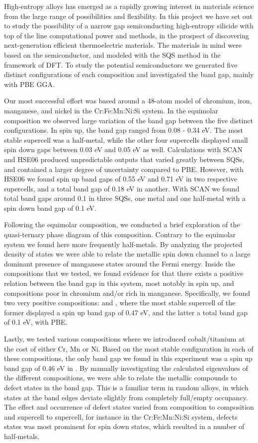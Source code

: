 \documentclass[UKenglish]{ifimaster}  %
\begin{document}
High-entropy alloys has emerged as a rapidly growing interest in materials science from the large range of possibilities and flexibility. In this project we have set out to study the possibility of a narrow gap semiconducting high-entropy silicide with top of the line computational power and methods, in the prospect of discovering next-generation efficient thermoelectric materials. The materials in mind were based on the  semiconductor, and modeled with the SQS method in the framework of DFT. To study the potential semiconductors we generated five distinct configurations of each composition and investigated the band gap, mainly with PBE GGA.  

Our most successful effort was based around a 48-atom model of chromium, iron, manganese, and nickel in the Cr:Fe:Mn:Ni:Si system. In the equimolar composition  we observed large variation of the band gap between the five distinct configurations. In spin up, the band gap ranged from 0.08 - 0.34 eV. The most stable supercell was a half-metal, while the other four supercells displayed small spin down gaps between 0.03 eV and 0.05 eV as well. Calculations with SCAN and HSE06 produced unpredictable outputs that varied greatly between SQSs, and contained a larger degree of uncertainty compared to PBE. However, with HSE06 we found spin up band gaps of 0.55 eV and 0.71 eV in two respective supercells, and a total band gap of 0.18 eV in another. With SCAN we found total band gaps around 0.1 in three SQSs, one metal and one half-metal with a spin down band gap of 0.1 eV.   

Following the equimolar composition, we conducted a brief exploration of the quasi-ternary phase diagram of this composition. Contrary to the equimolar system we found here more frequently half-metals. By analyzing the projected density of states we were able to relate the metallic spin down channel to a large dominant presence of manganese states around the Fermi energy.  Inside the compositions that we tested, we found evidence for that there exists a positive relation between the band gap in this system, most notably in spin up, and compositions poor in chromium and/or rich in manganese. Specifically, we found two very positive compositions:  and , where the most stable supercell of the former displayed a spin up band gap of 0.47 eV, and the latter a total band gap of 0.1 eV, with PBE.

Lastly, we tested various compositions where we introduced cobalt/titanium at the cost of either Cr, Mn or Ni. Based on the most stable configuration in each of these compositions, the only band gap we found in this experiment was a spin up band gap of 0.46 eV in . By manually investigating the calculated eigenvalues of the different compositions, we were able to relate the metallic compounds to defect states in the band gap. This is a familiar term in random alloys, in which states at the band edges deviate slightly from completely full/empty occupancy. The effect and occurrence of defect states varied from composition to composition and supercell to supercell, for instance in the Cr:Fe:Mn:Ni:Si system, defects states was most prominent for spin down states, which resulted in a number of half-metals. 
\end{document}

